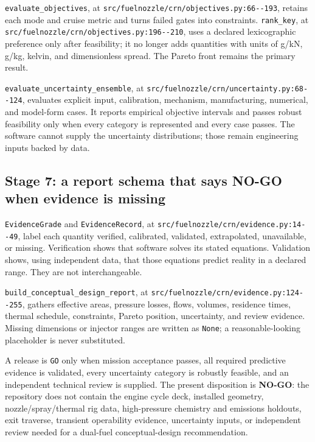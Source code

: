 \documentclass[11pt]{article}
\newcommand{\code}[1]{\nolinkurl{#1}}
\newcommand{\srcline}[2]{\nolinkurl{#1:#2}}
\begin{document}
\code{evaluate_objectives}, at
\srcline{src/fuelnozzle/crn/objectives.py}{66--193}, retains each mode and cruise metric and
turns failed gates into constraints. \code{rank_key}, at
\srcline{src/fuelnozzle/crn/objectives.py}{196--210}, uses a declared lexicographic preference
only after feasibility; it no longer adds quantities with units of g/kN, g/kg, kelvin, and
dimensionless spread. The Pareto front remains the primary result.

\code{evaluate_uncertainty_ensemble}, at
\srcline{src/fuelnozzle/crn/uncertainty.py}{68--124}, evaluates explicit input, calibration,
mechanism, manufacturing, numerical, and model-form cases. It reports empirical objective
intervals and passes robust feasibility only when every category is represented and every case
passes. The software cannot supply the uncertainty distributions; those remain engineering
inputs backed by data.

\subsection{Stage 7: a report schema that says NO-GO when evidence is missing}

\code{EvidenceGrade} and \code{EvidenceRecord}, at
\srcline{src/fuelnozzle/crn/evidence.py}{14--49}, label each quantity verified, calibrated,
validated, extrapolated, unavailable, or missing. Verification shows that software solves its
stated equations. Validation shows, using independent data, that those equations predict
reality in a declared range. They are not interchangeable.

\code{build_conceptual_design_report}, at
\srcline{src/fuelnozzle/crn/evidence.py}{124--255}, gathers effective areas, pressure losses,
flows, volumes, residence times, thermal schedule, constraints, Pareto position, uncertainty,
and review evidence. Missing dimensions or injector ranges are written as \code{None}; a
reasonable-looking placeholder is never substituted.

A release is \code{GO} only when mission acceptance passes, all required predictive evidence is
validated, every uncertainty category is robustly feasible, and an independent technical
review is supplied. The present disposition is \textbf{NO-GO}: the repository does not contain
the engine cycle deck, installed geometry, nozzle/spray/thermal rig data, high-pressure
chemistry and emissions holdouts, exit traverse, transient operability evidence, uncertainty
inputs, or independent review needed for a dual-fuel conceptual-design recommendation.
\end{document}
